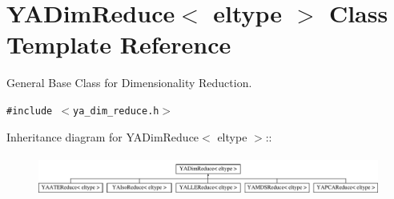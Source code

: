 \hypertarget{class_y_a_dim_reduce}{
\section{YADim\-Reduce$<$ eltype $>$ Class Template Reference}
\label{class_y_a_dim_reduce}
}
General Base Class for Dimensionality Reduction.  


{\tt \#include $<$ya\_\-dim\_\-reduce.h$>$}

Inheritance diagram for YADim\-Reduce$<$ eltype $>$::\begin{figure}[H]
\begin{center}
\leavevmode
\includegraphics[height=1.34132cm]{class_y_a_dim_reduce}
\end{center}
\end{figure}

